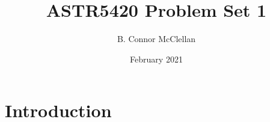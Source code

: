 \documentclass{article}
\title{ASTR5420 Problem Set 1}
\author{B. Connor McClellan}
\date{February 2021}
\begin{document}
\maketitle

\section{Introduction}
\end{document}

